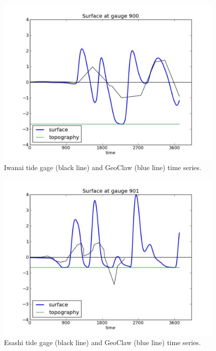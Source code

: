 \begin{figure}[ht]
\hfil\includegraphics[width=5.0in]{bp9/Iwanai.pdf}\hfil
\caption{\label{Iwanai}
Iwanai tide gage (black line) and GeoClaw (blue line) time series. 
  }
\end{figure}

\begin{figure}[ht]
\hfil\includegraphics[width=5.0in]{bp9/Esashi.pdf}\hfil
\caption{\label{Esashi}
Esashi tide gage (black line) and GeoClaw (blue line) time series. 
  }
\end{figure}


